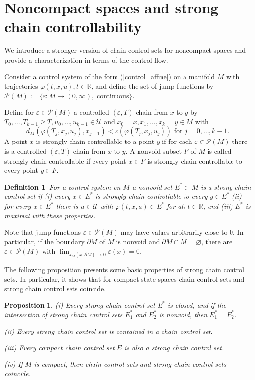 \documentclass[preprint,12pt]{elsarticle}
\newtheorem{definition}{Definition}
\newtheorem{proposition}{Proposition}
\begin{document}
\section{Noncompact spaces and strong chain controllability\label{Section3}}

We introduce a stronger version of chain control sets for noncompact spaces
and provide a characterization in terms of the control flow.

Consider a control system of the form (\ref{control_affine}) on a manifold $M$
with trajectories $\varphi(t,x,u),\allowbreak t\in\mathbb{R}$, and define the
set of jump functions by $\mathcal{P}(M):=\{\varepsilon:M\rightarrow
(0,\infty),$ continuous$\}$.

Define for $\varepsilon\in\mathcal{P}(M)$ a controlled $(\varepsilon,T)$-chain
from $x$ to $y$ by $T_{0},\ldots,T_{k-1}\allowbreak\geq T,u_{0},\ldots
,u_{k-1}\in\mathcal{U}$ and $x_{0}=x,x_{1},\ldots,x_{k}=y\in M$ with%
\[
d_{M}(\varphi(T_{j},x_{j},u_{j}),x_{j+1})<\varepsilon(\varphi(T_{j}%
,x_{j},u_{j}))\text{ for }j=0,\ldots,k-1.
\]
A point $x$ is strongly chain controllable to a point $y$ if for each
$\varepsilon\in\mathcal{P}(M)$ there is a controlled $(\varepsilon,T)$-chain
from $x$ to $y$. A nonvoid subset $F$ of $M$ is called strongly chain
controllable if every point $x\in F$ is strongly chain controllable to every
point $y\in F$.

\begin{definition}
\label{Definition_strong}For a control system on $M$ a nonvoid set $E^{\ast
}\subset M$ is a strong chain control set if (i) every $x\in E^{\ast}$ is
strongly chain controllable to every $y\in E^{\ast}$ (ii) for every $x\in
E^{\ast}$ there is $u\in\mathcal{U}$ with $\varphi(t,x,u)\in E^{\ast}$ for all
$t\in\mathbb{R}$, and (iii) $E^{\ast}$ is maximal with these properties.
\end{definition}

Note that jump functions $\varepsilon\in\mathcal{P}(M)$ may have values
arbitrarily close to $0$. In particular, if the boundary $\partial M$ of $M$
is nonvoid and $\partial M\cap M=\varnothing$, there are $\varepsilon
\in\mathcal{P}(M)$ with $\lim_{d_{M}(x,\partial M)\rightarrow0}\varepsilon
(x)=0$.

The following proposition presents some basic properties of strong chain
control sets. In particular, it shows that for compact state spaces chain
control sets and strong chain control sets coincide.

\begin{proposition}
\label{Proposition_compact}(i) Every strong chain control set $E^{\ast}$ is
closed, and if the intersection of strong chain control sets $E_{1}^{\ast}$
and $E_{2}^{\ast}$ is nonvoid, then $E_{1}^{\ast}=E_{2}^{\ast}$.

(ii) Every strong chain control set is contained in a chain control set.

(iii) Every compact chain control set $E$ is also a strong chain control set.

(iv) If $M$ is compact, then chain control sets and strong chain control sets coincide.
\end{proposition}
\end{document}
